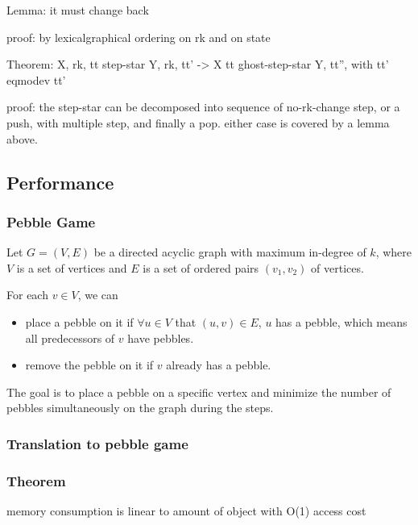 Lemma: it must change back

proof: by lexicalgraphical ordering on rk and on state

Theorem: X, rk, tt step-star Y, rk, tt' -> X tt ghost-step-star Y, tt'', with tt' eqmodev tt'

proof: the step-star can be decomposed into sequence of no-rk-change step, or a push, with multiple step, and finally a pop. either case is covered by a lemma above.

\subsection{Performance}
\subsubsection{Pebble Game}


Let $G=(V,E)$ be a directed acyclic graph with maximum in-degree of $k$, where $V$ is a set of vertices and $E$ is a set of ordered pairs $(v_1, v_2)$ of vertices.

For each $v\in V$, we can
\begin{itemize}
	\item place a pebble on it if $\forall u\in V$ that $(u, v)\in E$, $u$ has a pebble, which means all predecessors of $v$ have pebbles.
	\item remove the pebble on it if $v$ already has a pebble.
\end{itemize}

The goal is to place a pebble on a specific vertex and minimize the number of pebbles simultaneously on the graph during the steps.



\subsubsection{Translation to pebble game}
\subsubsection{Theorem}
memory consumption is linear to amount of object with O(1) access cost
